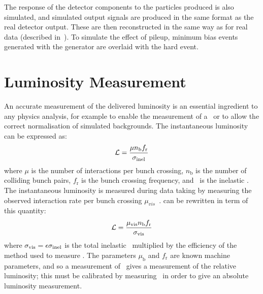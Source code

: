 The response of the detector components to the particles produced is also
simulated, and simulated output signals are produced in the same format as the
real detector output. These are then reconstructed in the same way as for real
data (described in~). To simulate the effect of pileup,
minimum bias events generated with the \pythia generator are overlaid with the
hard event.

\section{Luminosity Measurement}

An accurate measurement of the delivered luminosity is an essential ingredient
to any physics analysis, for example to enable the measurement of a \cx\ or to
allow the correct normalisation of simulated backgrounds. The instantaneous
luminosity can be expressed as:
\begin{equation}
\mathcal{L} = \frac{ \mu n_{\mathrm b} f_{\mathrm r} }{ \sigma_{\mathrm {inel} } }
\label{eqn:lumi-meas-1}
\end{equation}
where $\mu$ is the number of interactions per bunch crossing, $n_{\mathrm b}$ is the
number of colliding bunch pairs, $f_{\mathrm r}$ is the bunch crossing frequency, and
\sigmaInel\ is the inelastic \cx. The
instantaneous luminosity is measured during data taking by measuring the
observed interaction rate per bunch crossing $\mu_{vis}$~\cite{ATLAS-CONF-2011-116,Aad:2011dr}.  can
be rewritten in term of this quantity:
\begin{equation}
\mathcal{L} = \frac{ \mu_{\mathrm{vis}} n_{\mathrm b} f_{\mathrm r} }{ \sigma_{\mathrm {vis}} }
\label{eqn:lumi-meas-2}
\end{equation}
where $\sigma_{\mathrm {vis}} =\epsilon \sigma_{\mathrm {inel} }$ is the total inelastic \cx\
multiplied by the efficiency of the method used to measure \muVis. The
parameters $\mu_{\mathrm{b}}$ and $f_{\mathrm{r}}$ are known machine parameters, and so a
measurement of \muVis\ gives a measurement of the relative luminosity; this
must be calibrated by measuring \sigmaVis\ in order to give an absolute
luminosity measurement.

